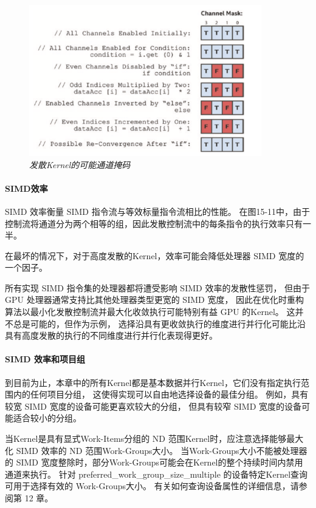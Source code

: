 \begin{figure}[H]
	\centering
	\includegraphics[width=0.9\textwidth]{figs/F15.11.png}
	\caption{\textit{发散Kernel的可能通道掩码 }}
\end{figure}

\paragraph{SIMD效率}

SIMD 效率衡量 SIMD 指令流与等效标量指令流相比的性能。 
在图15-11中，由于控制流将通道分为两个相等的组，因此发散控制流中的每条指令的执行效率只有一半。

在最坏的情况下，对于高度发散的Kernel，效率可能会降低处理器 SIMD 宽度的一个因子。

所有实现 SIMD 指令集的处理器都将遭受影响 SIMD 效率的发散性惩罚，
但由于 GPU 处理器通常支持比其他处理器类型更宽的 SIMD 宽度，
因此在优化时重构算法以最小化发散控制流并最大化收敛执行可能特别有益 GPU 的Kernel。 
这并不总是可能的，但作为示例，
选择沿具有更收敛执行的维度进行并行化可能比沿具有高度发散的执行的不同维度进行并行化表现得更好。

\paragraph{SIMD 效率和项目组}

到目前为止，本章中的所有Kernel都是基本数据并行Kernel，它们没有指定执行范围内的任何项目分组，
这使得实现可以自由地选择设备的最佳分组。 例如，具有较宽 SIMD 宽度的设备可能更喜欢较大的分组，
但具有较窄 SIMD 宽度的设备可能适合较小的分组。

当Kernel是具有显式Work-Items分组的 ND 范围Kernel时，应注意选择能够最大化 SIMD 效率的 ND 范围Work-Groups大小。 
当Work-Groups大小不能被处理器的 SIMD 宽度整除时，部分Work-Groups可能会在Kernel的整个持续时间内禁用通道来执行。 
针对 preferred\_work\_group\_size\_multiple 的设备特定Kernel查询可用于选择有效的 Work-Groups大小。 
有关如何查询设备属性的详细信息，请参阅第 12 章。

